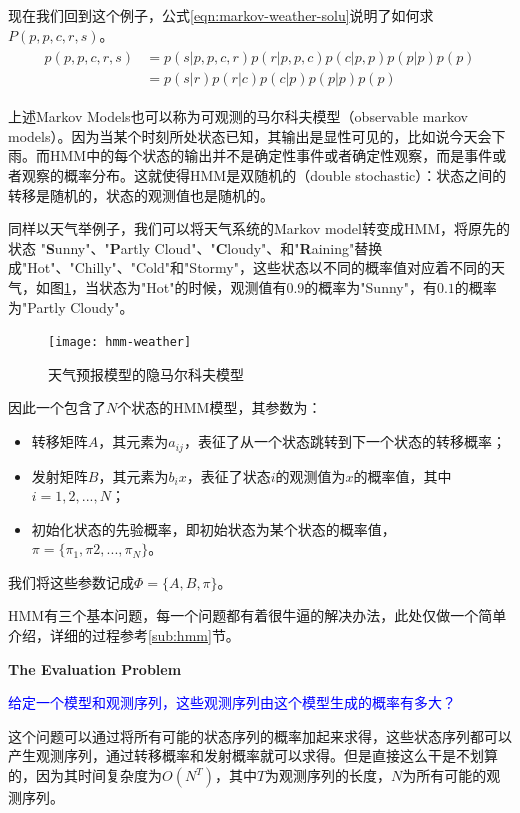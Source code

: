 现在我们回到这个例子，公式\ref{eqn:markov-weather-solu}说明了如何求$P(p,p,c,r,s)$。
\begin{align}
\label{eqn:markov-weather-solu}
\begin{split}
	p(p,p,c,r,s) &= p(s|p,p,c,r)p(r|p,p,c)p(c|p,p)p(p|p)p(p) \\
							 &= p(s|r) p(r|c) p(c|p) p(p|p) p(p)
\end{split}
\end{align}

上述Markov Models也可以称为可观测的马尔科夫模型（observable markov models）。因为当某个时刻所处状态已知，其输出是显性可见的，比如说今天会下雨。而HMM中的每个状态的输出并不是确定性事件或者确定性观察，而是事件或者观察的概率分布。这就使得HMM是双随机的（double stochastic）：状态之间的转移是随机的，状态的观测值也是随机的。

同样以天气举例子，我们可以将天气系统的Markov model转变成HMM，将原先的状态 "{\bf S}unny"、"{\bf P}artly Cloud"、"{\bf C}loudy"、和"{\bf R}aining"替换成"Hot"、"Chilly"、"Cold"和"Stormy"，这些状态以不同的概率值对应着不同的天气，如图\ref{fig:hmm-we}，当状态为"Hot"的时候，观测值有$0.9$的概率为"Sunny"，有$0.1$的概率为"Partly Cloudy"。
\begin{figure}[htbp]
	\centering
	\texttt{[image: hmm-weather]}
	\caption{天气预报模型的隐马尔科夫模型\label{fig:hmm-we}}
\end{figure}

因此一个包含了$N$个状态的HMM模型，其参数为：
\begin{itemize}
	\item 转移矩阵$A$，其元素为$a_{ij}$，表征了从一个状态跳转到下一个状态的转移概率；
	\item 发射矩阵$B$，其元素为$b_i{x}$，表征了状态$i$的观测值为$x$的概率值，其中$i=1,2,...,N$；
	\item 初始化状态的先验概率，即初始状态为某个状态的概率值，$\pi=\{\pi_{1}, \pi{2},...,\pi_{N}\}$。
\end{itemize}

我们将这些参数记成$\Phi=\{A,B,\pi\}$。

HMM有三个基本问题，每一个问题都有着很牛逼的解决办法，此处仅做一个简单介绍，详细的过程参考\ref{sub:hmm}节。

{\bf The Evaluation Problem}

\textcolor{blue}{给定一个模型和观测序列，这些观测序列由这个模型生成的概率有多大？}

这个问题可以通过将所有可能的状态序列的概率加起来求得，这些状态序列都可以产生观测序列，通过转移概率和发射概率就可以求得。但是直接这么干是不划算的，因为其时间复杂度为$O(N^{T})$，其中$T$为观测序列的长度，$N$为所有可能的观测序列。

